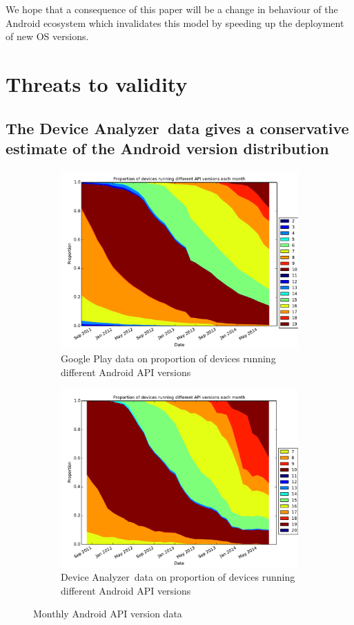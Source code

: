 \documentclass[conference,a4paper,twoside]{IEEEtran}
\newcommand{\da}{Device Analyzer}
\begin{document}
We hope that a consequence of this paper will be a change in behaviour of the Android ecosystem which invalidates this model by speeding up the deployment of new OS versions.

\section{Threats to validity}
\subsection{The \da\ data gives a conservative estimate of the Android version distribution}
\label{sec:representative}
\begin{figure}
 \centering
 \begin{subfigure}[b]{\columnwidth}
 \includegraphics[width=\columnwidth]{figures/googleplayapi}
 \caption{Google Play data on proportion of devices running different Android API versions}
 \label{fig:play_api}
\end{subfigure}
\begin{subfigure}[b]{\columnwidth}
 \includegraphics[width=\columnwidth]{figures/norm_api_gpcomp}
 \caption{\da\ data on proportion of devices running different Android API versions}
 \label{fig:da_api}
\end{subfigure}
\caption{Monthly Android API version data}
\end{figure}
\end{document}
